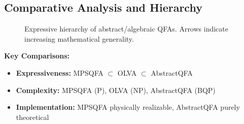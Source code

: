 \subsection*{Comparative Analysis and Hierarchy}
\begin{figure}[h]
\centering
{}
\caption{Expressive hierarchy of abstract/algebraic QFAs. Arrows indicate increasing mathematical generality.}
\label{fig:abstract-hierarchy}
\end{figure}

\textbf{Key Comparisons:}
\begin{itemize}
    \item \textbf{Expressiveness:} MPSQFA $\subset$ OLVA $\subset$ AbstractQFA
    \item \textbf{Complexity:} MPSQFA (P), OLVA (NP), AbstractQFA (BQP)
    \item \textbf{Implementation:} MPSQFA physically realizable, AbstractQFA purely theoretical
\end{itemize}